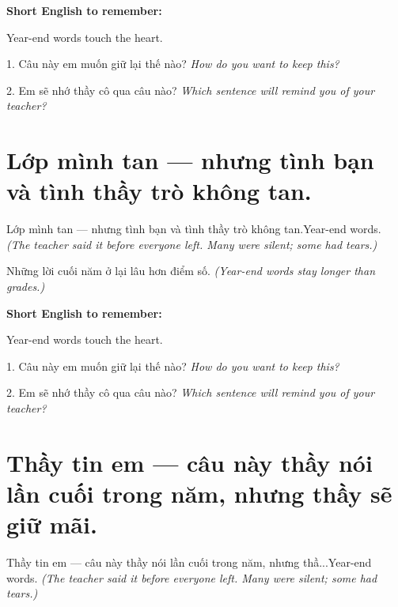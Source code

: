 \begin{ghinhoanh}
\textbf{Short English to remember:}

Year-end words touch the heart.

\end{ghinhoanh}

\begin{tuhocnhanh}
1. Câu này em muốn giữ lại thế nào? \textit{How do you want to keep this?}

2. Em sẽ nhớ thầy cô qua câu nào? \textit{Which sentence will remind you of your teacher?}
\end{tuhocnhanh}
\ngancach


\section{Lớp mình tan — nhưng tình bạn và tình thầy trò không tan.}
\begin{truyen}{Lớp mình tan — nhưng tình bạn và tình thầy trò không tan.}{Year-end words.}
\textit{(The teacher said it before everyone left. Many were silent; some had tears.)}
\end{truyen}

\begin{baihoc}
Những lời cuối năm ở lại lâu hơn điểm số.
\textit{(Year-end words stay longer than grades.)}
\end{baihoc}

\begin{ghinhoanh}
\textbf{Short English to remember:}

Year-end words touch the heart.

\end{ghinhoanh}

\begin{tuhocnhanh}
1. Câu này em muốn giữ lại thế nào? \textit{How do you want to keep this?}

2. Em sẽ nhớ thầy cô qua câu nào? \textit{Which sentence will remind you of your teacher?}
\end{tuhocnhanh}
\ngancach


\section{Thầy tin em — câu này thầy nói lần cuối trong năm, nhưng thầy sẽ giữ mãi.}
\begin{truyen}{Thầy tin em — câu này thầy nói lần cuối trong năm, nhưng thầ...}{Year-end words.}
\textit{(The teacher said it before everyone left. Many were silent; some had tears.)}
\end{truyen}

